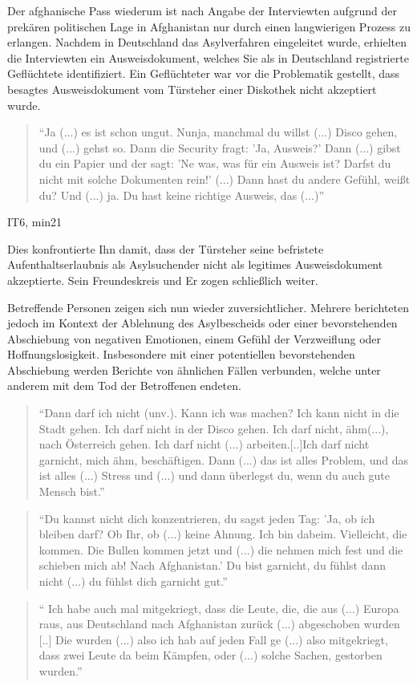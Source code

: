 Der afghanische Pass wiederum ist nach Angabe der Interviewten aufgrund der prekären politischen Lage in Afghanistan nur durch einen langwierigen Prozess zu erlangen.\newline
Nachdem in Deutschland das Asylverfahren eingeleitet wurde, erhielten die Interviewten ein Ausweisdokument, welches Sie als in Deutschland registrierte Geflüchtete identifiziert. Ein Geflüchteter war vor die Problematik gestellt, dass besagtes Ausweisdokument vom Türsteher einer Diskothek nicht akzeptiert wurde.
\begin{quote}
    ``Ja (...) es ist schon ungut. Nunja, manchmal du willst (...) Disco gehen, und (...) gehst so. Dann die Security fragt: 'Ja, Ausweis?' Dann (...) gibst du ein Papier und der sagt: 'Ne was, was für ein Ausweis ist? Darfst du nicht mit solche Dokumenten rein!' (...) Dann hast du andere Gefühl, weißt du? Und (...) ja. Du hast keine richtige Ausweis, das (...)''
\end{quote}
\caption{IT6, min21}
Dies konfrontierte Ihn damit, dass der Türsteher seine befristete Aufenthaltserlaubnis als Asylsuchender nicht als legitimes Ausweisdokument akzeptierte. Sein Freundeskreis und Er zogen schließlich weiter.


Betreffende Personen zeigen sich nun wieder zuversichtlicher. Mehrere berichteten jedoch im Kontext der Ablehnung des Asylbescheids oder einer bevorstehenden Abschiebung von negativen Emotionen, einem Gefühl der Verzweiflung oder Hoffnungslosigkeit. Insbesondere mit einer potentiellen bevorstehenden Abschiebung werden Berichte von ähnlichen Fällen verbunden, welche unter anderem mit dem Tod der Betroffenen endeten.

\begin{quote}
    ``Dann darf ich nicht (unv.). Kann ich was machen? Ich kann nicht in die Stadt gehen. Ich darf nicht in der Disco gehen. Ich darf nicht, ähm(...), nach Österreich gehen. Ich darf nicht (...) arbeiten.[..]Ich darf nicht garnicht, mich ähm, beschäftigen. Dann (...) das ist alles Problem, und das ist alles (...) Stress und (...) und dann überlegst du, wenn du auch gute Mensch bist.''
\end{quote}
\begin{quote}
    ``Du kannst nicht dich konzentrieren, du sagst jeden Tag: 'Ja, ob ich bleiben darf? Ob Ihr, ob (...) keine Ahnung. Ich bin dabeim. Vielleicht, die kommen. Die Bullen kommen jetzt und (...) die nehmen mich fest und die schieben mich ab! Nach Afghanistan.' Du bist garnicht, du fühlst dann nicht (...) du fühlst dich garnicht gut.''
\end{quote}
\begin{quote}
    `` Ich habe auch mal mitgekriegt, dass die Leute, die, die aus (...) Europa raus, aus Deutschland nach Afghanistan zurück (...) abgeschoben wurden [..] Die wurden (...) also ich hab auf jeden Fall ge (...) also mitgekriegt, dass zwei Leute da beim Kämpfen, oder (...) solche Sachen, gestorben wurden.''
\end{quote}
